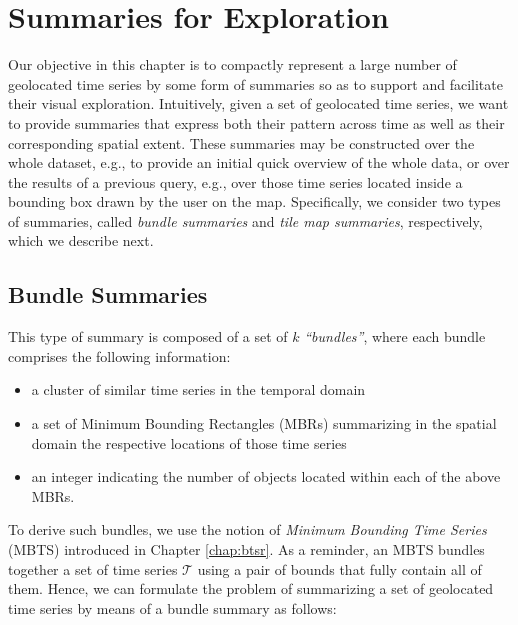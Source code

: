 
\section{Summaries for Exploration}
\label{sec:problem}

\graphicspath{{Papers/ElsevierBigDataResearch/}}

Our objective in this chapter is to compactly represent a large number of geolocated time series by some form of summaries so as to support and facilitate their visual exploration. Intuitively, given a set of geolocated time series, we want to provide summaries that express both their pattern across time as well as their corresponding spatial extent. These summaries may be constructed over the whole dataset, e.g., to provide an initial quick overview of the whole data, or over the results of a previous query, e.g., over those time series located inside a bounding box drawn by the user on the map. Specifically, we consider two types of summaries, called \emph{bundle summaries} and \emph{tile map summaries}, respectively, which we describe next.

\subsection{Bundle Summaries}
\label{subsec:bundle_sums}

This type of summary is composed of a set of $k$ {\em ``bundles''}, where each bundle comprises the following information:

\begin{itemize}
\item a cluster of similar time series in the temporal domain
\item a set of Minimum Bounding Rectangles (MBRs) summarizing in the spatial domain the respective locations of those time series
\item an integer indicating the number of objects located within each of the above MBRs.
\end{itemize}

To derive such bundles, we use the notion of {\em Minimum Bounding Time Series} (MBTS) introduced in Chapter \ref{chap:btsr}. As a reminder, an MBTS bundles together a set of time series  $\mathcal{T}$ using a pair of bounds that fully contain all of them. Hence, we can formulate the problem of summarizing a set of geolocated time series by means of a bundle summary as follows:

